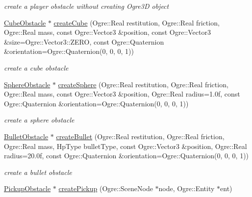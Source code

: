 \begin{DoxyCompactItemize}
\begin{DoxyCompactList}\small\item\em create a player obstacle without creating Ogre3D object \end{DoxyCompactList}\item 
\hyperlink{class_n_c_t_u_1_1_cube_obstacle}{Cube\+Obstacle} $\ast$ \hyperlink{class_n_c_t_u_1_1_obstacle_manager_a1a74bbd12d793b3e58535f08553834fa}{create\+Cube} (Ogre\+::\+Real restitution, Ogre\+::\+Real friction, Ogre\+::\+Real mass, const Ogre\+::\+Vector3 \&position, const Ogre\+::\+Vector3 \&size=Ogre\+::\+Vector3\+::\+Z\+E\+RO, const Ogre\+::\+Quaternion \&orientation=Ogre\+::\+Quaternion(0, 0, 0, 1))\hypertarget{class_n_c_t_u_1_1_obstacle_manager_a1a74bbd12d793b3e58535f08553834fa}{}\label{class_n_c_t_u_1_1_obstacle_manager_a1a74bbd12d793b3e58535f08553834fa}

\begin{DoxyCompactList}\small\item\em create a cube obstacle \end{DoxyCompactList}\item 
\hyperlink{class_n_c_t_u_1_1_sphere_obstacle}{Sphere\+Obstacle} $\ast$ \hyperlink{class_n_c_t_u_1_1_obstacle_manager_a00187a4c4360d8ac845b52e24c05ddac}{create\+Sphere} (Ogre\+::\+Real restitution, Ogre\+::\+Real friction, Ogre\+::\+Real mass, const Ogre\+::\+Vector3 \&position, Ogre\+::\+Real radius=1.\+0f, const Ogre\+::\+Quaternion \&orientation=\+Ogre\+::\+Quaternion(0, 0, 0, 1))\hypertarget{class_n_c_t_u_1_1_obstacle_manager_a00187a4c4360d8ac845b52e24c05ddac}{}\label{class_n_c_t_u_1_1_obstacle_manager_a00187a4c4360d8ac845b52e24c05ddac}

\begin{DoxyCompactList}\small\item\em create a sphere obstacle \end{DoxyCompactList}\item 
\hyperlink{class_n_c_t_u_1_1_bullet_obstacle}{Bullet\+Obstacle} $\ast$ \hyperlink{class_n_c_t_u_1_1_obstacle_manager_a38aebf62935a98e585e0b76615229892}{create\+Bullet} (Ogre\+::\+Real restitution, Ogre\+::\+Real friction, Ogre\+::\+Real mass, Hp\+Type bullet\+Type, const Ogre\+::\+Vector3 \&position, Ogre\+::\+Real radius=20.\+0f, const Ogre\+::\+Quaternion \&orientation=\+Ogre\+::\+Quaternion(0, 0, 0, 1))\hypertarget{class_n_c_t_u_1_1_obstacle_manager_a38aebf62935a98e585e0b76615229892}{}\label{class_n_c_t_u_1_1_obstacle_manager_a38aebf62935a98e585e0b76615229892}

\begin{DoxyCompactList}\small\item\em create a bullet obstacle \end{DoxyCompactList}\item 
\hyperlink{class_n_c_t_u_1_1_pickup_obstacle}{Pickup\+Obstacle} $\ast$ \hyperlink{class_n_c_t_u_1_1_obstacle_manager_a9a3da8a738775758a87768146808a3b9}{create\+Pickup} (Ogre\+::\+Scene\+Node $\ast$node, Ogre\+::\+Entity $\ast$ent)\hypertarget{class_n_c_t_u_1_1_obstacle_manager_a9a3da8a738775758a87768146808a3b9}{}\label{class_n_c_t_u_1_1_obstacle_manager_a9a3da8a738775758a87768146808a3b9}


\end{DoxyCompactItemize}
